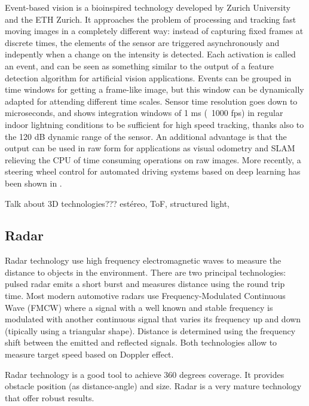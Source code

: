 Event-based vision is a bioinspired technology developed by Zurich University
and the ETH Zurich. It approaches the problem of processing and tracking fast 
moving images in a completely different way: instead of capturing fixed frames
at discrete times, the elements of the sensor are triggered asynchronously and
indepently when a change on the intensity is detected. Each activation is
called an event, and can be seen as something similar to the output of a 
feature detection algorithm for artificial vision applications.
Events can be grouped in time windows for getting a frame-like image, but this
window can be dynamically adapted for attending different time scales.
Sensor time resolution goes down to microseconds, and \cite{Mueggler2014} shows 
integration windows of 1 ms (~1000 fps) in regular indoor lightning conditions
to be sufficient for high speed tracking, thanks also to the 120 dB dynamic 
range of the sensor.
An additional advantage is that the output can be used in raw form for 
applications as visual odometry \cite{Censi2014} and SLAM \cite{Vidal2017}
relieving the CPU of time consuming operations on raw images.
More recently, a steering wheel control for automated driving systems 
based on deep learning has been shown in \cite{Maqueda2018}.
 
 
 
 Talk about 3D technologies??? estéreo, ToF, structured light, 
 

\subsection{Radar}

Radar technology use high frequency electromagnetic waves to measure the
distance to objects in the environment.
There are two principal technologies: pulsed radar emits a short burst and 
measures distance using the round trip time. Most modern automotive 
radars use Frequency-Modulated Continuous Wave (FMCW) where a signal with
a well known and stable frequency is modulated with another continuous signal
that varies its frequency up and down (tipically using a triangular shape).
Distance is determined using the frequency shift between the emitted and 
reflected signals. Both technologies allow to measure target speed based
on Doppler effect.

Radar technology is a good tool to achieve 360 degrees coverage. It provides 
obstacle position (as distance-angle) and size.
Radar is a very mature technology that offer robust results. 

